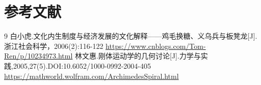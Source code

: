 \documentclass[withoutpreface,bwprint]{cumcmthesis} %
\begin{document}
\section{参考文献}


\begin{thebibliography}{9}
     白小虎.文化内生制度与经济发展的文化解释——鸡毛换糖、义乌兵与板凳龙[J].浙江社会科学，2006(2):116-122
    \url{https://www.cnblogs.com/Tom-Ren/p/10234973.html}
     林文惠.刚体运动学的几何讨论[J].力学与实践,2005,27(5).DOI:10.6052/1000-0992-2004-405
     \url{https://mathworld.wolfram.com/ArchimedesSpiral.html}
\end{thebibliography}

\newpage

\begin{appendices}


\end{appendices}
\end{document}

